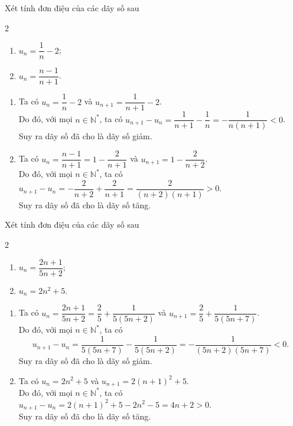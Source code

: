 \begin{vd}%
	Xét tính đơn điệu của các dãy số sau
	\begin{multicols}{2}
		\begin{enumerate}
			\item $u_n=\dfrac{1}{n}-2$;
			\item $u_n=\dfrac{n-1}{n+1}$.
		\end{enumerate}
	\end{multicols}
	\loigiai 
	{
	\begin{enumerate}
		\item Ta có $u_n=\dfrac{1}{n}-2$ và $u_{n+1}=\dfrac{1}{n+1}-2$.\\
		Do đó, với mọi $n\in \mathbb{N}^*$, ta có $u_{n+1}-u_n=\dfrac{1}{n+1}-\dfrac{1}{n}=-\dfrac{1}{n(n+1)}<0$.\\
		Suy ra dãy số đã cho là dãy số giảm.
		\item Ta có $u_n=\dfrac{n-1}{n+1}=1-\dfrac{2}{n+1}$ và $u_{n+1}=1-\dfrac{2}{n+2}$.\\
		Do đó, với mọi $n\in \mathbb{N}^*$, ta có $u_{n+1}-u_n=-\dfrac{2}{n+2}+\dfrac{2}{n+1}=\dfrac{2}{(n+2)(n+1)}>0$.\\
		Suy ra dãy số đã cho là dãy số tăng.
	\end{enumerate}
	}
\end{vd}

\begin{vd}%
	Xét tính đơn điệu của các dãy số sau
	\begin{multicols}{2}
		\begin{enumerate}
			\item $u_n=\dfrac{2n+1}{5n+2}$;
			\item $u_n=2n^2+5$.
		\end{enumerate}
	\end{multicols}
	\loigiai 
	{
		\begin{enumerate}
			\item Ta có $u_n=\dfrac{2n+1}{5n+2}=\dfrac{2}{5}+\dfrac{1}{5(5n+2)}$ và $u_{n+1}=\dfrac{2}{5}+\dfrac{1}{5(5n+7)}$.\\
			Do đó, với mọi $n\in \mathbb{N}^*$, ta có $$u_{n+1}-u_n=\dfrac{1}{5(5n+7)}-\dfrac{1}{5(5n+2)}=-\dfrac{1}{(5n+2)(5n+7)}<0.$$
			Suy ra dãy số đã cho là dãy số giảm.
			\item Ta có $u_n=2n^2+5$ và $u_{n+1}=2(n+1)^2+5$.\\
			Do đó, với mọi $n\in \mathbb{N}^*$, ta có $u_{n+1}-u_n=2(n+1)^2+5-2n^2-5=4n+2>0$.\\
			Suy ra dãy số đã cho là dãy số tăng.
		\end{enumerate}
	}
\end{vd}

